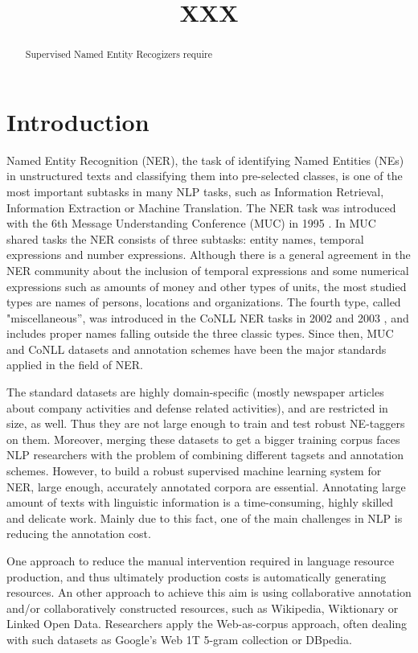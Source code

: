\documentclass[11pt]{article}
\title{XXX}
\date{}
\begin{document}
\maketitle
\begin{abstract}

Supervised Named Entity Recogizers require 

\end{abstract}

\section{Introduction}
\label{sec:intro}

Named Entity Recognition (NER), the task of identifying Named Entities (NEs) in unstructured texts and classifying them into pre-selected classes, is one of the most important subtasks in many NLP tasks, such as Information Retrieval, Information Extraction or Machine Translation. The NER task was introduced with the 6th Message Understanding Conference (MUC) in 1995 \cite{Grishman:96}. In MUC shared tasks the NER consists of three subtasks: entity names, temporal expressions and number expressions. Although there is a general agreement in the NER community about the inclusion of temporal expressions and some numerical expressions such as amounts of money and other types of units, the most studied types are names of persons, locations and organizations. The fourth type, called "miscellaneous'', was introduced in the CoNLL NER tasks in 2002 \cite{Tjong:02} and 2003 \cite{Tjong:03}, and includes proper names falling outside the three classic types. Since then, MUC and CoNLL datasets and annotation schemes have been the major standards applied in the field of NER. 

The standard datasets are highly domain-specific (mostly newspaper articles about company activities and defense related activities), and are restricted in size, as well. Thus they are not large enough to train and test robust NE-taggers on them. Moreover, merging these datasets to get a bigger training corpus faces NLP researchers with the problem of combining different tagsets and annotation schemes. However, to build a robust supervised machine learning system for NER, large enough, accurately annotated corpora are essential. Annotating large amount of texts with linguistic information is a time-consuming, highly skilled and delicate work. Mainly due to this fact, one of the main challenges in NLP is reducing the annotation cost. 

One approach to reduce the manual intervention required in language resource production, and thus ultimately production costs is automatically generating resources. An other approach to achieve this aim is using collaborative annotation and/or collaboratively constructed resources, such as Wikipedia, Wiktionary or Linked Open Data. Researchers apply the Web-as-corpus approach, often dealing with such datasets as Google's Web 1T 5-gram collection or DBpedia.  
\end{document}
